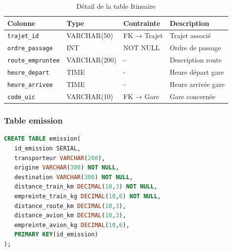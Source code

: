 \documentclass[12pt,a4paper]{article}
\begin{document}
\begin{table}[h!]
\centering
\begin{tabular}{|p{3.5cm}|p{2.5cm}|p{2.5cm}|p{4cm}|}
\hline
\textbf{Colonne} & \textbf{Type} & \textbf{Contrainte} & \textbf{Description} \\
\hline
\texttt{trajet\_id} & VARCHAR(50) & FK → Trajet & Trajet associé \\
\hline
\texttt{ordre\_passage} & INT & NOT NULL & Ordre de passage \\
\hline
\texttt{route\_empruntee} & VARCHAR(200) & - & Description route \\
\hline
\texttt{heure\_depart} & TIME & - & Heure départ gare \\
\hline
\texttt{heure\_arrivee} & TIME & - & Heure arrivée gare \\
\hline
\texttt{code\_uic} & VARCHAR(10) & FK → Gare & Gare concernée \\
\hline
\end{tabular}
\caption{Détail de la table Itineaire}
\end{table}

\subsubsection{Table emission}
\begin{lstlisting}[language=SQL, caption=Structure de la table emission]
CREATE TABLE emission(
   id_emission SERIAL,
   transporteur VARCHAR(200),
   origine VARCHAR(300) NOT NULL,
   destination VARCHAR(300) NOT NULL,
   distance_train_km DECIMAL(10,3) NOT NULL,
   empreinte_train_kg DECIMAL(10,6) NOT NULL,
   distance_route_km DECIMAL(10,3),
   distance_avion_km DECIMAL(10,3),
   empreinte_avion_kg DECIMAL(10,6),
   PRIMARY KEY(id_emission)
);
\end{lstlisting}
\end{document}

